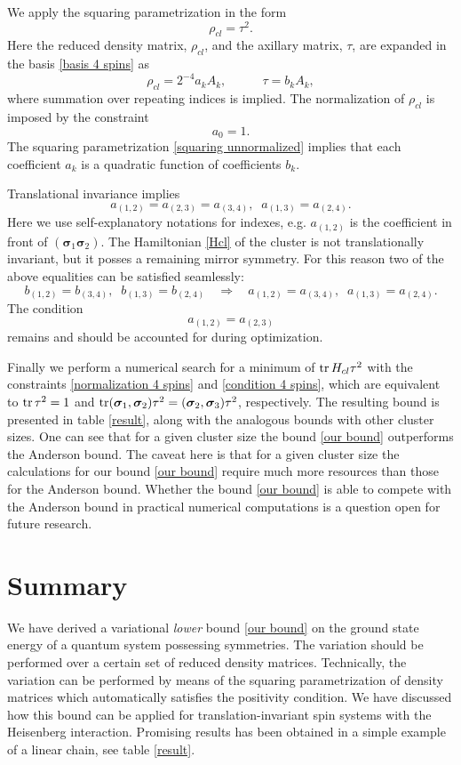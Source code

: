\documentclass[a4paper]{jpconf}
\renewcommand\[{\begin{equation}}
\renewcommand\]{\end{equation}}
\newcommand{\ssigma}{{\bm \sigma}}
\newcommand{\be}{\begin{equation}}
\newcommand{\ee}{\end{equation}}
\begin{document}
We apply the squaring parametrization  \cite{SqParam} in the form
\be\label{squaring unnormalized}
\rho_{cl}  = {\tau ^2}.
\ee
Here the reduced density matrix, $\rho_{cl}$, and the axillary matrix, $\tau$, are expanded in the basis \eqref{basis 4 spins} as
\[
\rho_{cl}  = 2^{-4}{a_k}{A_k},~~~~~~~~~~~~~\tau  = {b_k}{A_k},
\]
where summation over repeating indices is implied. The normalization of $\rho_{cl}$ is imposed by the constraint
\[{a_0} = 1.\label{normalization 4 spins}\]
The squaring parametrization \eqref{squaring unnormalized} implies that each coefficient $a_k$ is a quadratic function of coefficients $b_k$.

Translational invariance implies
\[{a_{(1,2)}} = {a_{(2,3)}} = {a_{(3,4)}},\;\;{a_{(1,3)}} = {a_{(2,4)}}.\]
Here we use self-explanatory notations for indexes, e.g. $a_{(1,2)}$ is the coefficient in front of $(\ssigma_1 \ssigma_2)$.
The Hamiltonian \eqref{Hcl} of the cluster  is not translationally invariant, but it posses a remaining mirror symmetry. For this reason two of the above equalities can be satisfied seamlessly:
\[
{b_{(1,2)}} = {b_{(3,4)}},\;\;{b_{(1,3)}} = {b_{(2,4)}}\;~~~\Rightarrow~~~\;
{a_{(1,2)}} = {a_{(3,4)}},\;\;{a_{(1,3)}} = {a_{(2,4)}}.
\]
The condition
\[a_{(1,2)}=a_{(2,3)}\label{condition 4 spins}\]
remains and should be accounted for during optimization.

Finally we perform a numerical search for a minimum of $\mathop{\mathrm{tr}}\nolimits H_{cl} \tau^2 $ with the constraints \eqref{normalization 4 spins} and \eqref{condition 4 spins}, which are equivalent to  $\mathop{\mathrm{tr}}\nolimits  \tau^2 =1$ and $\tr  (\ssigma_1,\ssigma_2)\tau^2 =(\ssigma_2,\ssigma_3)\tau^2$, respectively. The resulting bound is presented in table \ref{result}, along with the analogous bounds with other cluster sizes. One can see that for a given cluster size the bound \eqref{our bound} outperforms the Anderson bound. The caveat here is that for a given cluster size the calculations for our bound \eqref{our bound} require much more resources than those for the Anderson bound.   Whether  the bound \eqref{our bound} is able to compete with the Anderson bound in practical numerical computations is a question open for future research.


\section{Summary}

We have derived a variational {\it lower} bound \eqref{our bound} on the ground state energy of a quantum system possessing symmetries. The variation should be performed over a certain set of reduced density matrices. Technically, the variation can be performed by means of the squaring parametrization of density matrices \cite{SqParam} which automatically satisfies the positivity condition.   We have discussed how this bound can be applied for translation-invariant spin systems with the Heisenberg interaction. Promising results has been obtained in a simple example of a linear chain, see table \ref{result}.
\end{document}
